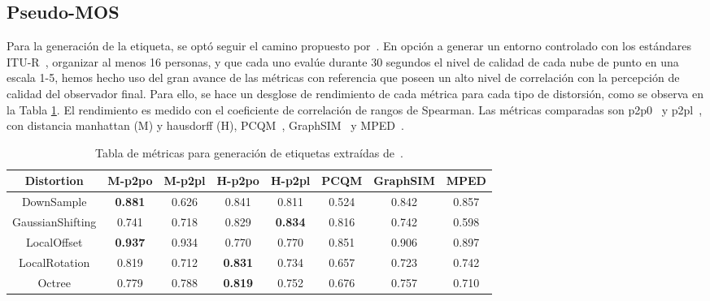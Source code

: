 \subsection{Pseudo-MOS}
Para la generación de la etiqueta, se optó seguir el camino propuesto por~\cite{ResSCNN}. 
En opción a generar un entorno controlado con los estándares ITU-R~\cite{ITU-R.2012, ITU-R.2021}, 
organizar al menos 16 personas, y que cada uno evalúe durante 30 segundos el nivel 
de calidad de cada nube de punto en una escala 1-5, hemos hecho uso del gran 
avance de las métricas con referencia que poseen un alto nivel de correlación con 
la percepción de calidad del observador final. 
Para ello, se hace un desglose de rendimiento de cada métrica para cada tipo 
de distorsión, como se observa en la Tabla \ref{tab:MetricsPerDistortion}. El 
rendimiento es medido con el coeficiente de correlación de rangos de Spearman.
Las métricas comparadas son p2p0~\cite{PointToPoint} y p2pl~\cite{PointToPlane}, 
con distancia manhattan (M) y hausdorff (H), PCQM~\cite{PCQM}, GraphSIM~\cite{GraphSIM} y 
MPED~\cite{MPED}.

\begin{table}[htp]
    \scriptsize
    \hspace{-.7cm}
    \begin{tabular}{|c|c|c|c|c|c|c|c|}
    \hline
        \rowcolor[HTML]{FFC702} 
        \textbf{Distortion} & \textbf{M-p2po} & \textbf{M-p2pl} & \textbf{H-p2po} & \textbf{H-p2pl} & \textbf{PCQM} & \textbf{GraphSIM} & \textbf{MPED} \\ \hline
        DownSample & \textbf{0.881} & 0.626 & 0.841 & 0.811 & 0.524 & 0.842 & 0.857 \\ \hline
        GaussianShifting & 0.741 & 0.718 & 0.829 & \textbf{0.834} & 0.816 & 0.742 & 0.598 \\ \hline
        LocalOffset & \textbf{0.937} & 0.934 & 0.770 & 0.770 & 0.851 & 0.906 & 0.897 \\ \hline
        LocalRotation & 0.819 & 0.712 & \textbf{0.831} & 0.734 & 0.657 & 0.723 & 0.742 \\ \hline
        Octree & 0.779 & 0.788 & \textbf{0.819} & 0.752 & 0.676 & 0.757 & 0.710 \\ \hline
    \end{tabular}
    \caption[Tabla de métricas para generación de etiquetas.]{
      Tabla de métricas para generación de etiquetas extraídas de~\cite{ResSCNN}.
  }
    \label{tab:MetricsPerDistortion}
\end{table}

